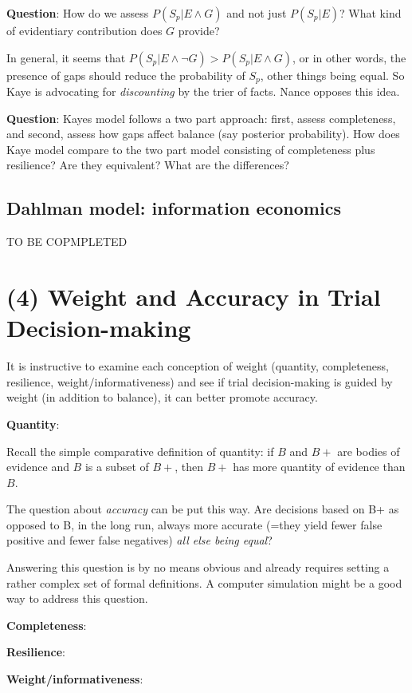 \documentclass[
  10pt,
  dvipsnames,enabledeprecatedfontcommands]{scrartcl}
\begin{document}
\textbf{Question}: How do we assess \(P(S_p | E \wedge G)\) and not just
\(P(S_p | E)\)? What kind of evidentiary contribution does \(G\)
provide?

In general, it seems that
\(P(S_p | E \wedge \neg G) > P(S_p | E \wedge G)\), or in other words,
the presence of gaps should reduce the probability of \(S_p\), other
things being equal. So Kaye is advocating for \emph{discounting} by the
trier of facts. Nance opposes this idea.

\textbf{Question}: Kayes model follows a two part approach: first,
assess completeness, and second, assess how gaps affect balance (say
posterior probability). How does Kaye model compare to the two part
model consisting of completeness plus resilience? Are they equivalent?
What are the differences?

\hypertarget{dahlman-model-information-economics}{%
\subsection{Dahlman model: information
economics}\label{dahlman-model-information-economics}}

TO BE COPMPLETED

\hypertarget{weight-and-accuracy-in-trial-decision-making}{%
\section{(4) Weight and Accuracy in Trial
Decision-making}\label{weight-and-accuracy-in-trial-decision-making}}

It is instructive to examine each conception of weight (quantity,
completeness, resilience, weight/informativeness) and see if trial
decision-making is guided by weight (in addition to balance), it can
better promote accuracy.

\textbf{Quantity}:

Recall the simple comparative definition of quantity: if \(B\) and
\(B+\) are bodies of evidence and \(B\) is a subset of \(B+\), then
\(B+\) has more quantity of evidence than \(B\).

The question about \emph{accuracy} can be put this way. Are decisions
based on B+ as opposed to B, in the long run, always more accurate
(=they yield fewer false positive and fewer false negatives)
\textit{all else being equal}?

Answering this question is by no means obvious and already requires
setting a rather complex set of formal definitions. A computer
simulation might be a good way to address this question.

\textbf{Completeness}:

\textbf{Resilience}:

\textbf{Weight/informativeness}:
\end{document}
